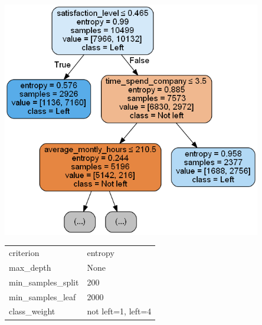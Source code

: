 \documentclass[a4paper]{article}
\begin{document}
\noindent \begin{minipage}{\textwidth}

  \begin{minipage}[b]{0.60\textwidth}
    \centering

    \includegraphics[width=0.85\textwidth]{albero2_bis}

  \end{minipage}
  \hfill
  \begin{minipage}[b]{0.3\textwidth}
    \centering
    \setlength{\tabcolsep}{10pt} %
\renewcommand{\arraystretch}{1.5} %
    \begin{tabularx}{\textwidth}{|lX|}
	\hline
	criterion                & entropy      \\
	max\_depth               & None         \\
	min\_samples\_split      & 200         \\
	min\_samples\_leaf       & 2000         \\
	class\_weight            & not left=1, left=4     \\\hline
	\end{tabularx}
      	    \label{img:model3}  
    \end{minipage}
  \end{minipage}
  
\end{document}
